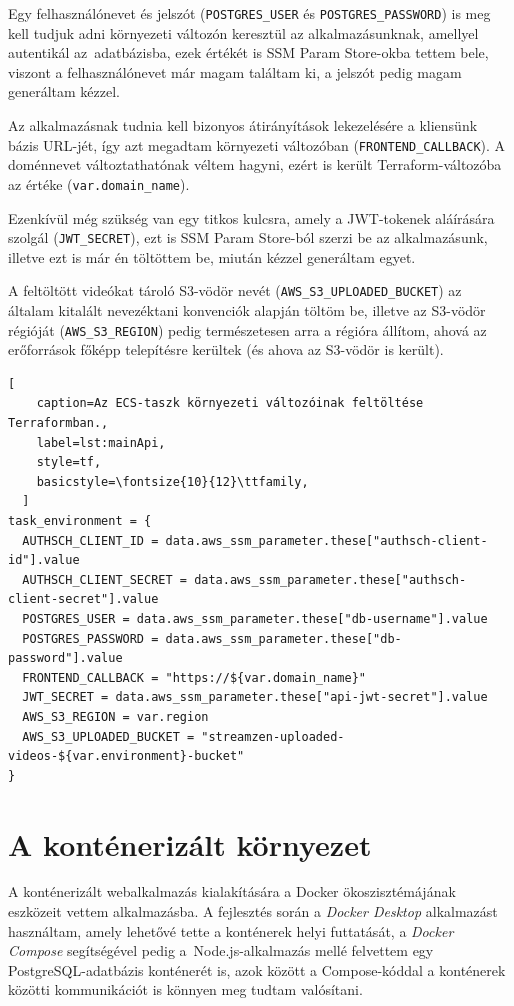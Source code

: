 Egy felhasználónevet és jelszót (\verb|POSTGRES_USER| és \verb|POSTGRES_PASSWORD|) is meg kell tudjuk adni környezeti változón keresztül az alkalmazásunknak, amellyel autentikál az~adatbázisba, ezek értékét is SSM Param Store-okba tettem bele, viszont a felhasználónevet már magam találtam ki, a jelszót pedig magam generáltam kézzel.

Az alkalmazásnak tudnia kell bizonyos átirányítások lekezelésére a kliensünk bázis URL-jét, így azt megadtam környezeti változóban (\verb|FRONTEND_CALLBACK|). A doménnevet változtathatónak véltem hagyni, ezért is került Terraform-változóba az értéke (\verb|var.domain_name|).

Ezenkívül még szükség van egy titkos kulcsra, amely a JWT-tokenek aláírására szolgál (\verb|JWT_SECRET|), ezt is SSM Param Store-ból szerzi be az alkalmazásunk, illetve ezt is már én töltöttem be, miután kézzel generáltam egyet.

A feltöltött videókat tároló S3-vödör nevét (\verb|AWS_S3_UPLOADED_BUCKET|) az általam kitalált nevezéktani konvenciók alapján töltöm be, illetve az S3-vödör régióját (\verb|AWS_S3_REGION|) pedig természetesen arra a régióra állítom, ahová az erőforrások főképp telepítésre kerültek (és ahova az S3-vödör is került).

\begin{minipage}{0.92\textwidth}
  \begin{lstlisting}[
    caption=Az ECS-taszk környezeti változóinak feltöltése Terraformban.,
    label=lst:mainApi,
    style=tf,
    basicstyle=\fontsize{10}{12}\ttfamily,
  ]
task_environment = {
  AUTHSCH_CLIENT_ID = data.aws_ssm_parameter.these["authsch-client-id"].value
  AUTHSCH_CLIENT_SECRET = data.aws_ssm_parameter.these["authsch-client-secret"].value
  POSTGRES_USER = data.aws_ssm_parameter.these["db-username"].value
  POSTGRES_PASSWORD = data.aws_ssm_parameter.these["db-password"].value
  FRONTEND_CALLBACK = "https://${var.domain_name}"
  JWT_SECRET = data.aws_ssm_parameter.these["api-jwt-secret"].value
  AWS_S3_REGION = var.region
  AWS_S3_UPLOADED_BUCKET = "streamzen-uploaded-videos-${var.environment}-bucket"
}
\end{lstlisting}
\end{minipage}

\section{A konténerizált környezet}

A konténerizált webalkalmazás kialakítására a Docker ökoszisztémájának eszközeit vettem alkalmazásba. A fejlesztés során a \emph{Docker Desktop} alkalmazást használtam, amely lehetővé tette a konténerek helyi futtatását, a \emph{Docker Compose} segítségével pedig a~Node.js-alkalmazás mellé felvettem egy PostgreSQL-adatbázis konténerét is, azok között a Compose-kóddal a konténerek közötti kommunikációt is könnyen meg tudtam valósítani.

